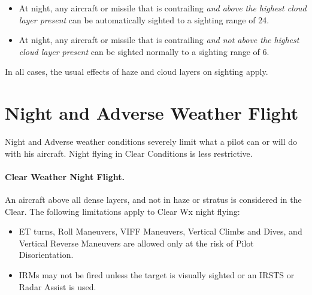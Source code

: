 \begin{advancedrules}
{\begin{itemize}
\item
At night, any aircraft or missile that is contrailing \emph{and above the highest cloud layer present} can be automatically sighted to a sighting range of 24. 

\item At night, any aircraft or missile that is contrailing \emph{and not above the highest cloud layer present} can be sighted normally to a sighting range of 6.
\end{itemize}

In all cases, the usual effects of haze and cloud layers on sighting apply.
}

\section{Night and Adverse Weather Flight}
\label{rule:night-and-adverse-weather-flight}

Night and Adverse weather conditions severely limit what a pilot can or will do with his aircraft. Night flying in Clear Conditions is less restrictive.


\paragraph{Clear Weather Night Flight.} An aircraft above all dense layers, and not in haze or stratus is considered in the Clear. The following limitations apply to Clear Wx night flying:

\begin{itemize}

    \item ET turns, Roll Maneuvers, VIFF Maneuvers, Vertical Climbs and Dives, and Vertical Reverse Maneuvers are allowed only at the risk of Pilot Disorientation.

    \item IRMs may not be fired unless the target is visually sighted or an IRSTS or Radar Assist is used.


\end{itemize}
\end{advancedrules}
